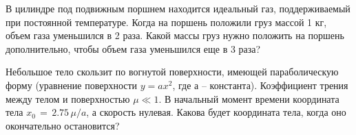 \AddProb В цилиндре под подвижным поршнем находится идеальный газ, поддерживаемый при постоянной температуре. 
Когда на поршень положили груз массой 1 кг, объем газа уменьшился в 2 раза. Какой массы груз нужно положить на поршень дополнительно, 
чтобы объем газа уменьшился еще в 3 раза?

\AddProb Небольшое тело скользит по вогнутой поверхности, имеющей параболическую форму (уравнение поверхности $y=ax^2$, где а -- константа). 
Коэффициент трения между телом и поверхностью $\mu \ll 1$. В начальный момент времени координата тела $x_0\,=\,2.75\,\mu/a$, а скорость нулевая. 
Какова будет координата тела, когда оно окончательно остановится?